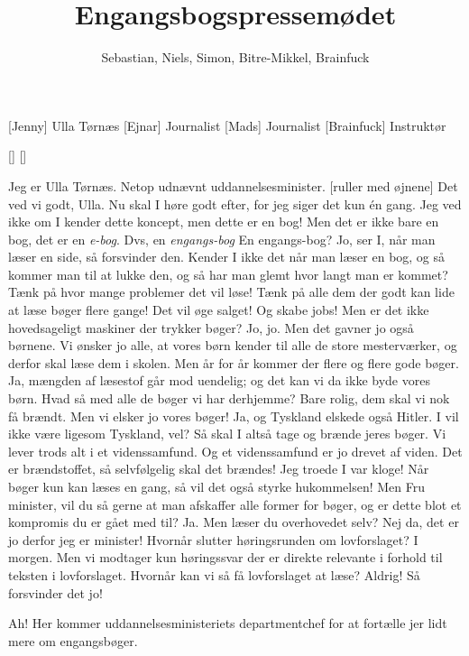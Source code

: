 \documentclass[a4paper,11pt]{article}
\title{Engangsbogspressemødet}
\author{Sebastian, Niels, Simon, Bitre-Mikkel, Brainfuck}
\begin{document}
\maketitle

\begin{roles}
[Jenny] Ulla Tørnæs
[Ejnar] Journalist
[Mads] Journalist
[Brainfuck] Instruktør
\end{roles}

\begin{props}
[]
[]
\end{props}

\begin{sketch}

 Jeg er Ulla Tørnæs.  Netop udnævnt uddannelsesminister.
[ruller med øjnene] Det ved vi godt, Ulla.
 Nu skal I høre godt efter, for jeg siger det kun én gang.
 Jeg ved ikke om I kender dette koncept, men dette er en bog! 
 Men det er ikke bare en bog, det er en \emph{e-bog}. Dvs, en \emph{engangs-bog}
 En engangs-bog?
 Jo, ser I, når man læser en side, så forsvinder den. 
 Kender I ikke det når man læser en bog, og så kommer man til at lukke den, og så har man glemt hvor langt man er kommet? 
 Tænk på hvor mange problemer det vil løse! Tænk på alle dem der godt kan lide at læse bøger flere gange! Det vil øge salget! Og skabe jobs!
 Men er det ikke hovedsageligt maskiner der trykker bøger?
 Jo, jo. Men det gavner jo også børnene. Vi ønsker jo alle, at vores børn kender til alle de store mesterværker, og derfor skal læse dem i skolen. Men år for år kommer der flere og flere gode bøger. Ja, mængden af læsestof går mod uendelig; og det kan vi da ikke byde vores børn.
 Hvad så med alle de bøger vi har derhjemme?
 Bare rolig, dem skal vi nok få brændt.
 Men vi elsker jo vores bøger!
 Ja, og Tyskland elskede også Hitler. I vil ikke være ligesom Tyskland, vel? Så skal I altså tage og brænde jeres bøger.
 Vi lever trods alt i et videnssamfund. Og et videnssamfund er jo drevet af viden. Det er brændstoffet, så selvfølgelig skal det brændes! Jeg troede I var kloge!
 Når bøger kun kan læses en gang, så vil det også styrke hukommelsen!
 Men Fru minister, vil du så gerne at man afskaffer alle former for bøger, og er dette blot et kompromis du er gået med til?
 Ja.
 Men læser du overhovedet selv?
 Nej da, det er jo derfor jeg er minister!
 Hvornår slutter høringsrunden om lovforslaget?
 I morgen. Men vi modtager kun høringssvar der er direkte relevante i forhold til teksten i lovforslaget.
 Hvornår kan vi så få lovforslaget at læse?
 Aldrig! Så forsvinder det jo!


 Ah!  Her kommer uddannelsesministeriets departmentchef for at fortælle jer lidt mere om engangsbøger.


\end{sketch}
\end{document}
